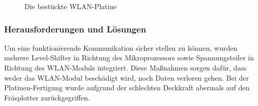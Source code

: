     \begin{figure}[tbh]
      \begin{centering}
      \par\end{centering}
      \caption{Die bestückte WLAN-Platine}
      \label{WLAN-Platine}
    \end{figure}

    \subsubsection{Herausforderungen und Lösungen}
    Um eine funktionierende Kommunikation sicher stellen zu können, wurden mehrere Level-Shifter in Richtung des Mikroprozessors sowie Spannungsteiler in Richtung des WLAN-Moduls
    integriert. Diese Maßnahmen sorgen dafür, dass weder das WLAN-Modul beschädigt wird, noch Daten verloren gehen.
    Bei der Platinen-Fertigung wurde aufgrund der schlechten Deckkraft abermals auf den Fräsplotter zurückgegriffen.
